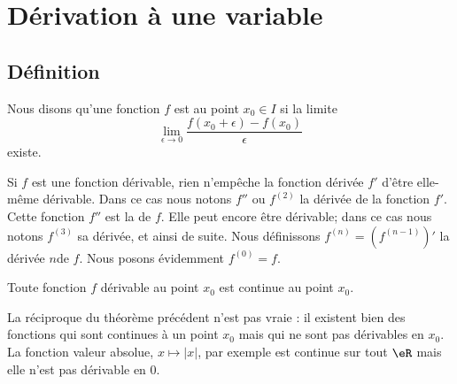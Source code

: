 \section{Dérivation à une variable}

\subsection{Définition}

\begin{definition}\label{defderivable}
    Nous disons qu'une fonction \( f\) est  au point \( x_0\in I\) si la limite
    \begin{equation}
        \lim_{\epsilon\to 0}\frac{ f(x_0+\epsilon)-f(x_0) }{ \epsilon }
    \end{equation}
    existe.
\end{definition}

Si \( f\) est une fonction dérivable, rien n'empêche la fonction dérivée \( f'\) d'être elle-même dérivable. Dans ce cas nous notons \( f''\) ou \( f^{(2)}\) la dérivée de la fonction \( f'\). Cette fonction $f''$ est la  de \( f\). Elle peut encore être dérivable; dans ce cas nous notons \( f^{(3)}\) sa dérivée, et ainsi de suite. Nous définissons \( f^{(n)}=(f^{(n-1)})'\) la dérivée \( n\)\ieme de \( f\). Nous posons évidemment $f^{(0)}=f$.

\begin{theorem}
  Toute fonction $f$ dérivable au point $x_0$ est continue au point $x_0$. 
\end{theorem}

\begin{remark}
     La réciproque du théorème précédent n'est pas vraie : il existent bien des fonctions qui sont continues à un point $x_0$ mais qui ne sont pas dérivables en $x_0$. La fonction valeur absolue, $x\mapsto |x|$, par exemple est continue sur tout $\eR$ mais elle n'est pas dérivable en $0$. 
\end{remark}

